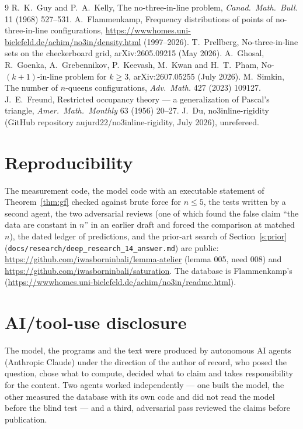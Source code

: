 \documentclass[11pt,a4paper]{article}
\begin{document}
\begin{thebibliography}{9}
 R.~K.~Guy and P.~A.~Kelly, The no-three-in-line problem, \emph{Canad.\ Math.\ Bull.} 11 (1968) 527--531.
 A.~Flammenkamp, Frequency distributions of points of no-three-in-line configurations,
\url{https://wwwhomes.uni-bielefeld.de/achim/no3in/density.html} (1997--2026).
 T.~Prellberg, No-three-in-line sets on the checkerboard grid, arXiv:2605.09215 (May 2026).
 A.~Ghosal, R.~Goenka, A.~Grebennikov, P.~Keevash, M.~Kwan and H.~T.~Pham, No-$(k+1)$-in-line problem for
$k\ge3$, arXiv:2607.05255 (July 2026).
 M.~Simkin, The number of $n$-queens configurations, \emph{Adv.\ Math.} 427 (2023) 109127.
 J.~E.~Freund, Restricted occupancy theory --- a generalization of Pascal's triangle, \emph{Amer.\ Math.\
Monthly} 63 (1956) 20--27.
 J.~Du, no3inline-rigidity (GitHub repository aujurd22/no3inline-rigidity, July 2026), unrefereed.
\end{thebibliography}

\section{Reproducibility}
The measurement code, the model code with an executable statement of Theorem~\ref{thm:gf} checked against brute force
for $n\le5$, the tests written by a second agent, the two adversarial reviews (one of which found the false claim
``the data are constant in $n$'' in an earlier draft and forced the comparison at matched $n$), the dated ledger of
predictions, and the prior-art search of Section~\ref{s:prior} (\texttt{docs/research/deep\_research\_14\_answer.md}) are public: \url{https://github.com/iwasborninbali/lemma-atelier} (lemma 005, need 008) and
\url{https://github.com/iwasborninbali/saturation}.  The database is Flammenkamp's
(\url{https://wwwhomes.uni-bielefeld.de/achim/no3in/readme.html}).

\section*{AI/tool-use disclosure}
The model, the programs and the text were produced by autonomous AI agents (Anthropic Claude) under the direction
of the author of record, who posed the question, chose what to compute, decided what to claim and takes responsibility
for the content.  Two agents worked independently --- one built the model, the other measured the database with its
own code and did not read the model before the blind test --- and a third, adversarial pass reviewed the claims
before publication.
\end{document}
